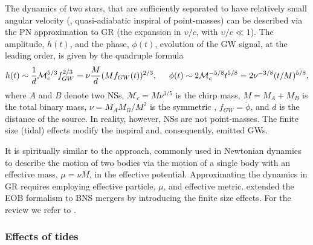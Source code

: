 The dynamics of two stars, that are sufficiently separated to have relatively small 
angular velocity (\ie, quasi-adiabatic inspiral of point-masses) 
can be described via the \ac{PN} approximation to \ac{GR} 
(the expansion in $\upsilon/c$, with $\upsilon/c\ll 1$).
%
The amplitude, $h(t)$, and the phase, $\phi(t)$, evolution of the \ac{GW} signal, at the leading order, 
is given by the quadruple formula \citep{Radice:2020ddv} 
%
\begin{equation}
\label{eq:intro:gw_wave}
h(t) \sim \frac{1}{d}\mathcal{M}_c^{5/3} f_{GW}^{2/3} = \nu\frac{M}{d}(Mf_{GW}(t))^{2/3}, \hspace{5mm} 
\phi(t) \sim 2\mathcal{M}_c^{-5/8}t^{5/8} = 2\nu^{-3/8}(t/M)^{5/8},
\end{equation}
%
where $A$ and $B$ denote two \acp{NS}, $\mathcal{M}_c = M\nu^{3/5}$ is the chirp mass, $M = M_A + M_B$ is the total binary mass, 
$\nu = M_A M_B/M^2$ is the symmetric \mr{}, $f_{GW} = \dot{\phi}$, and $d$ is the distance of the source.
%
In reality, however, \acp{NS} are not point-masses. 
The finite size (tidal) effects modify the 
inspiral and, consequently, emitted \acp{GW}. 
%


It is spiritually similar to the approach, commonly used in Newtonian dynamics to 
describe the motion of two bodies via the motion of a single body with an effective mass, 
$\mu=\nu M$, in the effective potential. Approximating the dynamics in \ac{GR} requires 
employing effective particle, $\mu$, and effective metric. 
%
\citet{Damour:2009wj} extended the \ac{EOB} formalism to \ac{BNS} mergers by 
introducing the finite size effects. For the review we refer to \citet{Damour:2012mv}.


\subsubsection{Effects of tides}

